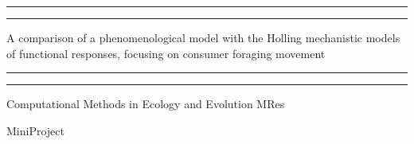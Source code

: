 \documentclass[11pt, a4paper, titlepage]{article}
\begin{document}
	
\begin{titlepage} %
	
	\centering %
	
	\scshape %
	
	\vspace*{\baselineskip} %
	
	
	
	
	\rule{\textwidth}{1.6pt}\vspace*{-\baselineskip}\vspace*{2pt} %
	
	\rule{\textwidth}{0.4pt} %
	
	\vspace{0.75\baselineskip} %
	
	{\LARGE A comparison of a phenomenological model with the Holling mechanistic models of functional responses, focusing on consumer foraging movement\\} %
	
	\vspace{0.75\baselineskip} %
	
	\rule{\textwidth}{0.4pt}\vspace*{-\baselineskip}\vspace{3.2pt} %
	
	\rule{\textwidth}{1.6pt} %
	
	\vspace{2\baselineskip} %
	
	
	
	
	Computational Methods in Ecology and Evolution MRes
	\vspace{0.5\baselineskip}
	
	 MiniProject %
	
	\vspace*{3\baselineskip} %
	

\end{titlepage}
\end{document}
